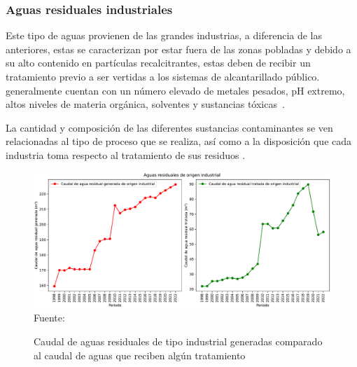 \subsubsection{Aguas residuales industriales}
Este tipo de aguas provienen de las grandes industrias, a diferencia de las anteriores, estas se caracterizan por estar fuera de las zonas pobladas y debido a su alto contenido en partículas recalcitrantes, estas deben de recibir un tratamiento previo a ser vertidas a los sistemas de alcantarillado público. generalmente cuentan con un número elevado de metales pesados, pH extremo, altos niveles de materia orgánica, solventes y sustancias tóxicas~\citep{lazcano2016}.\par
La cantidad y composición de las diferentes sustancias contaminantes se ven relacionadas al tipo de proceso que se realiza, así como a la disposición que cada industria toma respecto al tratamiento de sus residuos \citep{Hanchang2009}.
\begin{figure}[H]
	\centering
	\includegraphics[scale=0.45]{../Images/AR_industrial.pdf}
	\\\small{Fuente: \cite{INEGIJAL}}
	\caption{Caudal de aguas residuales de tipo industrial generadas comparado al caudal de aguas que reciben algún tratamiento}
\end{figure}
